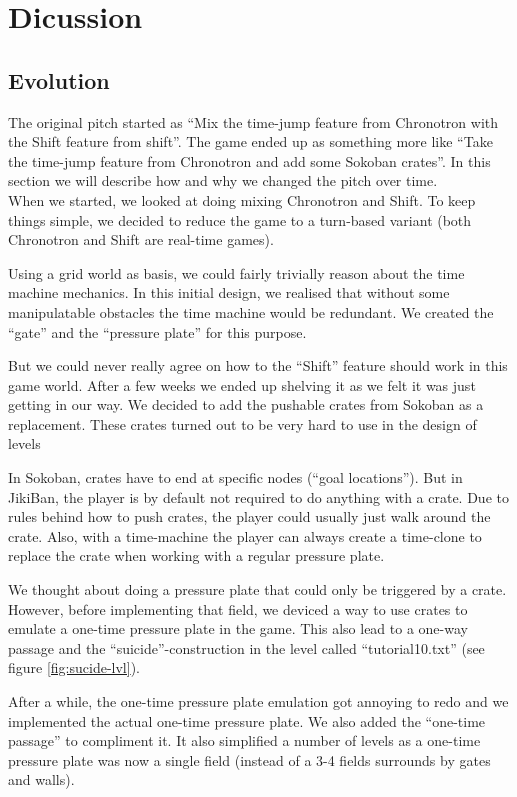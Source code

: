 \section{Dicussion}

\subsection{Evolution}
The original pitch started as ``Mix the time-jump feature from
Chronotron with the Shift feature from shift''.  The game ended up as
something more like ``Take the time-jump feature from Chronotron and
add some Sokoban crates''.  In this section we will describe how and why
we changed the pitch over time.\\


When we started, we looked at doing mixing Chronotron and Shift.  To
keep things simple, we decided to reduce the game to a turn-based
variant (both Chronotron and Shift are real-time games).

Using a grid world as basis, we could fairly trivially reason about
the time machine mechanics.  In this initial design, we realised that
without some manipulatable obstacles the time machine would be
redundant.  We created the ``gate'' and the ``pressure plate'' for
this purpose.

But we could never really agree on how to the ``Shift'' feature should
work in this game world.  After a few weeks we ended up shelving it as
we felt it was just getting in our way.  We decided to add the
pushable crates from Sokoban as a replacement.  These crates turned out
to be very hard to use in the design of levels

In Sokoban, crates have to end at specific nodes (``goal locations'').
But in JikiBan, the player is by default not required to do anything
with a crate.  Due to rules behind how to push crates, the player
could usually just walk around the crate.  Also, with a time-machine
the player can always create a time-clone to replace the crate when
working with a regular pressure plate.

We thought about doing a pressure plate that could only be triggered
by a crate.  However, before implementing that field, we deviced a way
to use crates to emulate a one-time pressure plate in the game.  This
also lead to a one-way passage and the ``suicide''-construction in the
level called ``tutorial10.txt'' (see figure \ref{fig:sucide-lvl}).

After a while, the one-time pressure plate emulation got annoying to
redo and we implemented the actual one-time pressure plate. We also
added the ``one-time passage'' to compliment it.  It also simplified a
number of levels as a one-time pressure plate was now a single field
(instead of a 3-4 fields surrounds by gates and walls).

